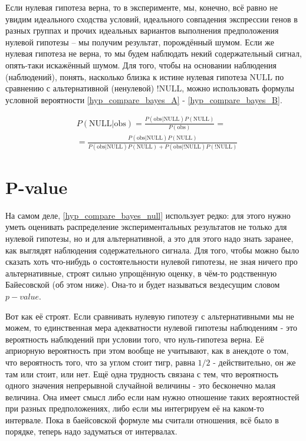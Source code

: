 \documentclass{book}
\begin{document}
Если нулевая гипотеза верна, то в эксперименте, мы, конечно, всё равно не увидим идеального сходства условий, идеального совпадения экспрессии генов в разных группах и прочих идеальных вариантов выполнения предположения нулевой гипотезы -- мы получим результат, порождённый шумом. Если же нулевая гипотеза не верна, то мы будем наблюдать некий содержательный сигнал, опять-таки искажённый шумом. Для того, чтобы на основании наблюдения (наблюдений), понять, насколько близка к истине нулевая гипотеза $\text{NULL}$ по сравнению с альтернативной (ненулевой) $\text{!NULL}$, можно использовать формулы условной вероятности \eqref{hyp_compare_bayes_A} - \eqref{hyp_compare_bayes_B}. 

\begin{align}\label{hyp_compare_bayes_null}
   &P\left(\text{NULL|obs}\right)=
   \frac{P\left(\text{obs|NULL}\right) P\left(\text{NULL}\right)}{P\left(\text{obs}\right)} = \nonumber \\
   &=\frac{P\left(\text{obs|NULL}\right) P\left(\text{NULL}\right)}{P\left(\text{obs|NULL}\right) P\left(\text{NULL}\right)+P\left(\text{obs|!NULL}\right) P\left(\text{!NULL}\right)} 
\end{align}

\section*{P-value}
На самом деле, \eqref{hyp_compare_bayes_null} использует редко: для этого нужно уметь оценивать распределение экспериментальных результатов не только для нулевой гипотезы, но и для альтернативной, а это для этого надо знать заранее, как выглядят наблюдения содержательного сигнала. Для того, чтобы можно было сказать хоть что-нибудь о состоятельности нулевой гипотезы, не зная ничего про альтернативные, строят сильно упрощённую оценку, в чём-то родственную Байесовской (об этом ниже). Она-то и будет называться вездесущим словом $p-value$.

Вот как её строят. Если сравнивать нулевую гипотезу с альтернативными мы не можем, то единственная мера адекватности нулевой гипотезы наблюдениям - это вероятность наблюдений при условии того, что нуль-гипотеза верна. Её априорную вероятность при этом вообще не учитывают, как в анекдоте о том, что вероятность того, что за углом стоит тигр, равна $1/2$ - действительно, он же там или стоит, или нет. Ещё одна трудность связана с тем, что вероятность одного значения непрерывной случайной величины - это бесконечно малая величина. Она имеет смысл либо если нам нужно отношение таких вероятностей при разных предположениях, либо если мы интегрируем её на каком-то интервале. Пока в баейсовской формуле мы считали отношения, всё было в порядке, теперь надо задуматься от интервалах.
\end{document}
